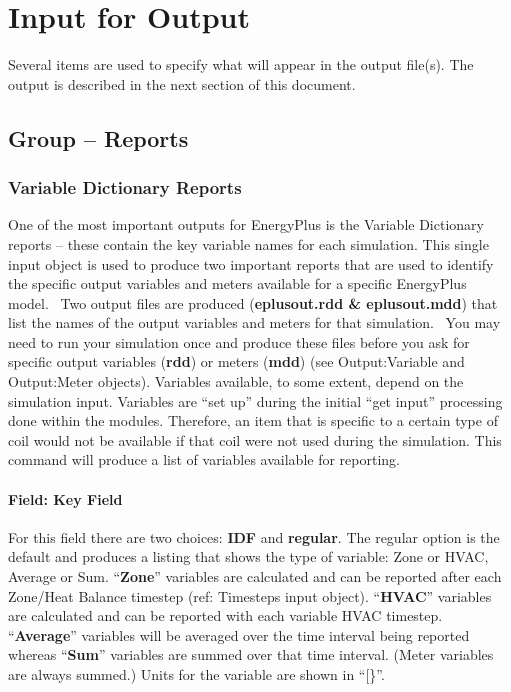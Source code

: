 \chapter{Input for Output}\label{input-for-output}

Several items are used to specify what will appear in the output file(s). The output is described in the next section of this document.

\section{Group -- Reports}\label{group-reports}

\subsection{Variable Dictionary Reports}\label{variable-dictionary-reports}

One of the most important outputs for EnergyPlus is the Variable Dictionary reports -- these contain the key variable names for each simulation. This single input object is used to produce two important reports that are used to identify the specific output variables and meters available for a specific EnergyPlus model.~ Two output files are produced (\textbf{eplusout.rdd \& eplusout.mdd}) that list the names of the output variables and meters for that simulation.~ You may need to run your simulation once and produce these files before you ask for specific output variables (\textbf{rdd}) or meters (\textbf{mdd}) (see Output:Variable and Output:Meter objects). Variables available, to some extent, depend on the simulation input. Variables are ``set up'' during the initial ``get input'' processing done within the modules. Therefore, an item that is specific to a certain type of coil would not be available if that coil were not used during the simulation. This command will produce a list of variables available for reporting.

\subsubsection{Field: Key Field}\label{field-key-field}

For this field there are two choices: \textbf{IDF} and \textbf{regular}. The regular option is the default and produces a listing that shows the type of variable: Zone or HVAC, Average or Sum. ``\textbf{Zone}'' variables are calculated and can be reported after each Zone/Heat Balance timestep (ref: Timesteps input object). ``\textbf{HVAC}'' variables are calculated and can be reported with each variable HVAC timestep. ``\textbf{Average}'' variables will be averaged over the time interval being reported whereas ``\textbf{Sum}'' variables are summed over that time interval. (Meter variables are always summed.) Units for the variable are shown in ``{[}\}''.

